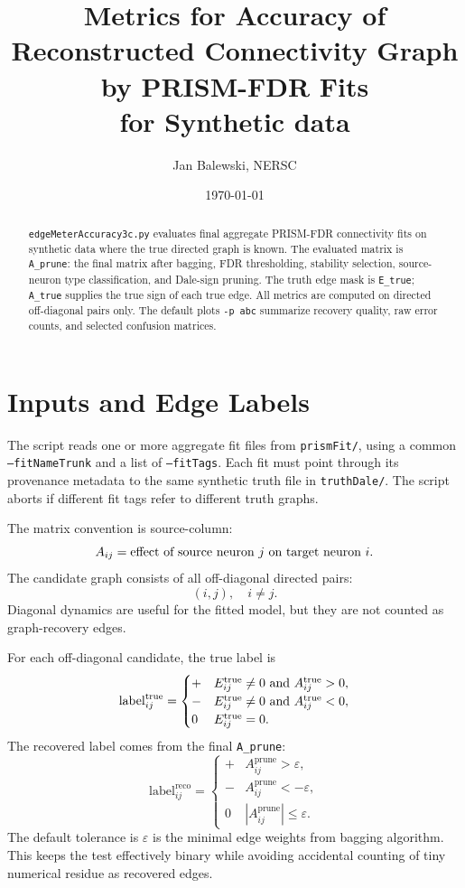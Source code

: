 \documentclass[11pt]{article}
\title{Metrics for Accuracy of Reconstructed Connectivity Graph by PRISM-FDR Fits\\for Synthetic data}
\author{Jan Balewski, NERSC}
\date{\today}
\begin{document}
\maketitle

\begin{abstract}
\texttt{edgeMeterAccuracy3c.py} evaluates final aggregate PRISM-FDR connectivity
fits on synthetic data where the true directed graph is known. The evaluated
matrix is \texttt{A\_prune}: the final matrix after bagging, FDR thresholding,
stability selection, source-neuron type classification, and Dale-sign pruning.
The truth edge mask is \texttt{E\_true}; \texttt{A\_true} supplies the true
sign of each true edge. All metrics are computed on directed off-diagonal
pairs only. The default plots \texttt{-p abc} summarize recovery quality,
raw error counts, and selected confusion matrices.
\end{abstract}

\tableofcontents


\section{Inputs and Edge Labels}
\label{sec:inputs}

The script reads one or more aggregate fit files from \texttt{prismFit/},
using a common \texttt{--fitNameTrunk} and a list of \texttt{--fitTags}. Each
fit must point through its provenance metadata to the same synthetic truth
file in \texttt{truthDale/}. The script aborts if different fit tags refer to
different truth graphs.

The matrix convention is source-column:
\[
  A_{ij} = \hbox{effect of source neuron } j
  \hbox{ on target neuron } i .
\]
The candidate graph consists of all off-diagonal directed pairs:
\[
  (i,j), \quad i\ne j .
\]
Diagonal dynamics are useful for the fitted model, but they are not counted
as graph-recovery edges.

For each off-diagonal candidate, the true label is
\[
\mathrm{label}^{\mathrm{true}}_{ij} =
\begin{cases}
+ & E^{\mathrm{true}}_{ij}\ne0 \hbox{ and } A^{\mathrm{true}}_{ij}>0,\\
- & E^{\mathrm{true}}_{ij}\ne0 \hbox{ and } A^{\mathrm{true}}_{ij}<0,\\
0 & E^{\mathrm{true}}_{ij}=0 .
\end{cases}
\]
The recovered label comes from the final \texttt{A\_prune}:
\[
\mathrm{label}^{\mathrm{reco}}_{ij} =
\begin{cases}
+ & A^{\mathrm{prune}}_{ij} > \varepsilon,\\
- & A^{\mathrm{prune}}_{ij} < -\varepsilon,\\
0 & |A^{\mathrm{prune}}_{ij}|\le\varepsilon .
\end{cases}
\]
The default tolerance is \(\varepsilon\) is the minimal edge weights from bagging algorithm. This keeps the test
effectively binary while avoiding accidental counting of tiny numerical
residue as recovered edges.
\end{document}
